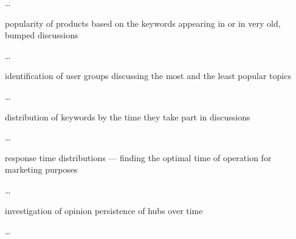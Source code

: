    \ldots
    
    popularity of products based on the keywords appearing in  or in very old, bumped discussions
    
    \ldots
    
    identification of user groups discussing the most and the least popular topics
    
    \ldots
    
    distribution of keywords by the time they take part in discussions
    
    \ldots
    
    response time distributions --- finding the optimal time of operation for marketing purposes
    
    \ldots
    
    investigation of opinion persistence of hubs over time
    
    \ldots